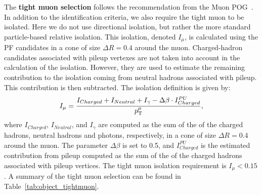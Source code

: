  
The \textbf{tight muon selection} follows the recommendation from the Muon POG~\cite{MuonID}.
In addition to the identification criteria, we also require the tight muon to be isolated. 
Here we do not use directional isolation, but rather the more standard particle-based relative
isolation. 
This isolation, denoted $I_\mu$, is calculated using the PF candidates in a cone of size $\Delta R =
0.4$ around the muon. Charged-hadron candidates associated with pileup vertexes are not taken into
account in the calculation of the isolation. However, they are used to estimate the remaining
contribution to the isolation coming from neutral hadrons associated with pileup. This contribution
is then subtracted. 
The isolation definition is given by:
\begin{equation}
I_\mu = \frac{I_{Charged} + I_{Neutral} + I_{\gamma} - \Delta\beta\cdot I_{Charged}^{PU}}
             {p_{\mathrm{T}}^\mu} , 
\label{eqn:iso}
\end{equation}
where $I_{Charged}$, $I_{Neutral}$, and $I_{\gamma}$ are computed as the sum of the \pt of the
charged hadrons, neutral hadrons and photons, respectively, in a cone of size $\Delta R = 0.4$
around the muon. The parameter $\Delta\beta$ is set to 0.5, and $I_{Charged}^{PU}$ is the estimated
contribution from pileup computed as the sum of the \pt of the charged hadrons associated with
pileup vertices.
The tight muon isolation requirement is $I_\mu < 0.15$.
A summary of the tight muon selection can be found in Table~\ref{tab:object_tightmuon}. 

